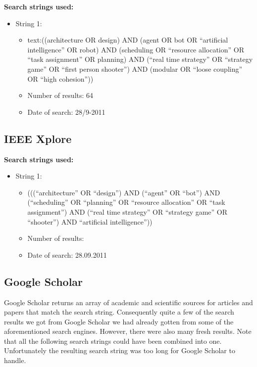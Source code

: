 \textbf{Search strings used:}
\begin{itemize}
\item String 1:
\begin{itemize}
\item text:((architecture OR design) AND (agent OR bot OR ``artificial intelligence'' OR robot) AND (scheduling OR ``resource allocation'' OR ``task assignment'' OR planning) AND (``real time strategy'' OR ``strategy game'' OR ``first person shooter'') AND (modular OR ``loose coupling'' OR ``high cohesion''))
\item Number of results: 64
\item Date of search: 28/9-2011
\end{itemize}
\end{itemize}

\subsection{IEEE Xplore}
\label{sub:ieee_xplore}
\textbf{Search strings used:}
\begin{itemize}
\item String 1:
\begin{itemize}
\item (((``architecture'' OR ``design'') AND (``agent'' OR ``bot'') AND (``scheduling'' OR ``planning'' OR ``resource allocation'' OR ``task assignment'') AND (``real time strategy'' OR ``strategy game'' OR ``shooter'') AND ``artificial intelligence''))
\item Number of results: 
\item Date of search: 28.09.2011
\end{itemize}
\end{itemize}

\subsection{Google Scholar}
\label{sub:google_scholar}
Google Scholar returns an array of academic and scientific sources for articles and papers that match the search string. Consequently quite a few of the search results we got from Google Scholar we had already gotten from some of the aforementioned search engines. However, there were also many fresh results. Note that all the following search strings could have been combined into one. Unfortunately the resulting search string was too long for Google Scholar to handle.

